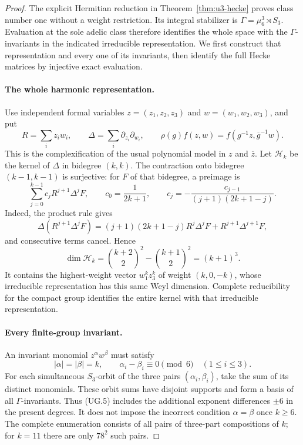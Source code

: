 \documentclass[11pt,a4paper]{article}
\theoremstyle{definition}
\begin{document}
\begin{proof}
The explicit Hermitian reduction in Theorem~\ref{thm:u3-hecke} proves
class number one without a weight restriction. Its integral stabilizer
is $\Gamma=\mu_6^3\rtimes S_3$. Evaluation at the sole adelic class
therefore identifies the whole space with the $\Gamma$-invariants in
the indicated irreducible representation. We first construct that
representation and every one of its invariants, then identify the full
Hecke matrices by injective exact evaluation.

\paragraph{The whole harmonic representation.}
Use independent formal variables $z=(z_1,z_2,z_3)$ and
$w=(w_1,w_2,w_3)$, and put
\[
 R=\sum_i z_iw_i,\qquad
 \Delta=\sum_i\partial_{z_i}\partial_{w_i},\qquad
 \rho(g)f(z,w)=f(g^{-1}z,\overline g^{-1}w).
 \tag{UG.3}
\]
This is the complexification of the usual polynomial model in $z$ and
$\overline z$. Let $\mathcal H_k$ be the kernel of $\Delta$ in
bidegree $(k,k)$. The contraction onto bidegree $(k-1,k-1)$ is
surjective: for $F$ of that bidegree, a preimage is
\[
 \sum_{j=0}^{k-1}c_jR^{j+1}\Delta^jF,\qquad
 c_0=\frac1{2k+1},\qquad
 c_j=-\frac{c_{j-1}}{(j+1)(2k+1-j)}.
 \tag{UG.4}
\]
Indeed, the product rule gives
\[
 \Delta(R^{j+1}\Delta^jF)
 =(j+1)(2k+1-j)R^j\Delta^jF+R^{j+1}\Delta^{j+1}F,
\]
and consecutive terms cancel. Hence
\[
 \dim\mathcal H_k
 =\binom{k+2}{2}^{\!2}-\binom{k+1}{2}^{\!2}=(k+1)^3.
\]
It contains the highest-weight vector $w_1^kz_3^k$ of weight
$(k,0,-k)$, whose irreducible representation has this same Weyl
dimension. Complete reducibility for the compact group identifies
the entire kernel with that irreducible representation.

\paragraph{Every finite-group invariant.}
An invariant monomial $z^\alpha w^\beta$ must satisfy
\[
 |\alpha|=|\beta|=k,\qquad
 \alpha_i-\beta_i\equiv0\pmod6\quad(1\le i\le3).
 \tag{UG.5}
\]
For each simultaneous $S_3$-orbit of the three pairs
$(\alpha_i,\beta_i)$, take the sum of its distinct monomials.
These orbit sums have disjoint supports and form a basis of all
$\Gamma$-invariants. Thus (UG.5) includes the additional exponent
differences $\pm6$ in the present degrees. It does not impose the
incorrect condition $\alpha=\beta$ once $k\ge6$.
The complete enumeration consists of all pairs of three-part
compositions of $k$; for $k=11$ there are only $78^2$ such pairs.


\end{proof}
\end{document}
